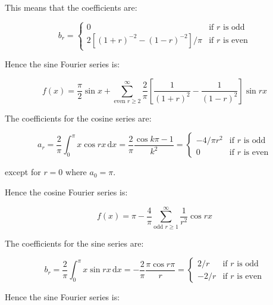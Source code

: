 \documentclass[12pt]{article}
\begin{document}
This means that the coefficients are:

\begin{equation}
    b_{r} =
    \begin{cases}
        0 & \text{if } r \text{ is odd} \\
        2 \left[ (1 + r)^{-2} - (1 - r)^{-2} \right]/\pi & \text{if } r \text{ is even}
    \end{cases}
\end{equation}

Hence the sine Fourier series is:

\begin{equation}
    f(x) = \frac{\pi}{2} \sin{x} + \sum_{\text{even }r \ge 2}^{\infty} \frac{2}{\pi} \left[ \frac{1}{(1 + r)^{2}} - \frac{1}{(1 - r)^{2}} \right] \sin{rx}
\end{equation}

The coefficients for the cosine series are:

\begin{equation}
    a_{r} = \frac{2}{\pi} \int_{0}^{\pi} x \cos{rx} \, \mathrm{d}x = \frac{2}{\pi} \frac{\cos{k\pi} - 1}{k^{2}} =
    \begin{cases}
        -4/\pi r^{2} & \text{if } r \text{ is odd} \\
        0 & \text{if } r \text{ is even}
    \end{cases}
\end{equation}

except for $r = 0$ where $a_{0} = \pi$.

Hence the cosine Fourier series is:

\begin{equation}
    f(x) = \pi - \frac{4}{\pi} \sum_{\text{odd }r \ge 1}^{\infty} \frac{1}{r^{2}} \cos{rx}
\end{equation}

The coefficients for the sine series are:

\begin{equation}
    b_{r} = \frac{2}{\pi} \int_{0}^{\pi} x \sin{rx} \, \mathrm{d}x = -\frac{2}{\pi} \frac{\pi \cos{r\pi}}{r} =
    \begin{cases}
        2/r & \text{if } r \text{ is odd} \\
        -2/r & \text{if } r \text{ is even}
    \end{cases}
\end{equation}

Hence the sine Fourier series is:
\end{document}
